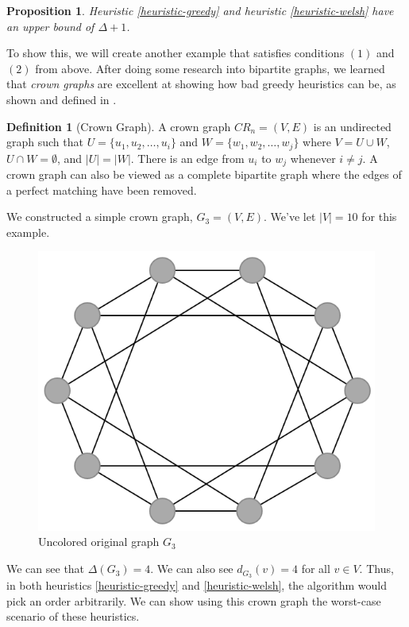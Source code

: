 \documentclass{article}
\newcounter{heuristic} \setcounter{heuristic}{0}
\newtheorem{prop}{Proposition}
\theoremstyle{definition}
\newtheorem{definition}{Definition}
\begin{document}
\begin{prop}
Heuristic \ref{heuristic-greedy} and heuristic \ref{heuristic-welsh} have an upper bound of \(\Delta + 1\).
\end{prop}

To show this, we will create another example that satisfies conditions \((1)\) and \((2)\) from above. After doing some research into bipartite graphs, we learned that \emph{crown graphs} are excellent at showing how bad greedy heuristics can be, as shown and defined in \cite{kordecki}.

\begin{definition}[Crown Graph]
A crown graph \(CR_n = (V, E)\) is an undirected graph such that \(U = \{u_1, u_2, \dots, u_i\}\) and \(W = \{w_1, w_2, \dots, w_j\}\) where \(V = U \cup W\), \(U \cap W = \emptyset\), and \(|U| = |W|\). There is an edge from \(u_i\) to \(w_j\) whenever \(i \neq j\). A crown graph can also be viewed as a complete bipartite graph where the edges of a perfect matching have been removed.
\end{definition}

We constructed a simple crown graph, \(G_3 = (V, E)\). We've let \(|V| = 10\) for this example.


\begin{figure}[H]
\centering
\includegraphics[scale=0.38]{images/graph-4.png}
\caption{Uncolored original graph \(G_3\)}
\end{figure}

We can see that \(\Delta(G_3) = 4\). We can also see \(d_{G_3}(v) = 4\) for all \(v \in V\). Thus, in both heuristics \ref{heuristic-greedy} and \ref{heuristic-welsh}, the algorithm would pick an order arbitrarily. We can show using this crown graph the worst-case scenario of these heuristics.
\end{document}
